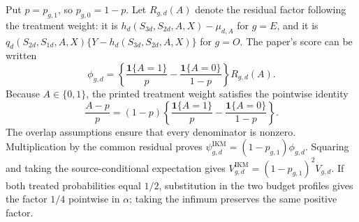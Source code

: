 Put \(p=p_{g,1}\), so \(p_{g,0}=1-p\). Let \(R_{g,d}(A)\) denote the residual factor following the treatment weight: it is \(h_d(S_{3d},S_{2d},A,X)-\mu_{d,A}\) for \(g=E\), and it is \(q_d(S_{2d},S_{1d},A,X)\{Y-h_d(S_{3d},S_{2d},A,X)\}\) for \(g=O\). The paper's score can be written
\[
 \phi_{g,d}
 =\left\{\frac{\mathbf 1\{A=1\}}p
 -\frac{\mathbf 1\{A=0\}}{1-p}\right\}R_{g,d}(A).
\]
Because \(A\in\{0,1\}\), the printed treatment weight satisfies the pointwise identity
\[
 \frac{A-p}{p}
 =(1-p)\left\{\frac{\mathbf 1\{A=1\}}p
 -\frac{\mathbf 1\{A=0\}}{1-p}\right\}.
\]
The overlap assumptions ensure that every denominator is nonzero. Multiplication by the common residual proves \(\psi_{g,d}^{\mathrm{IKM}}=(1-p_{g,1})\phi_{g,d}\). Squaring and taking the source-conditional expectation gives \(V_{g,d}^{\mathrm{IKM}}=(1-p_{g,1})^2V_{g,d}\). If both treated probabilities equal \(1/2\), substitution in the two budget profiles gives the factor \(1/4\) pointwise in \(\alpha\); taking the infimum preserves the same positive factor.